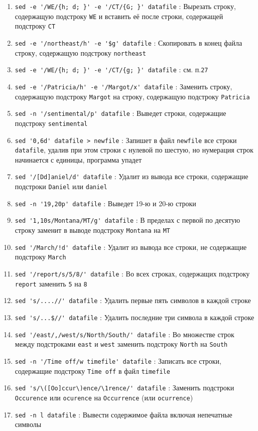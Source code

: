 \documentclass[12pt, a4paper]{article}
\begin{document}
\begin{enumerate}
  \item \verb|sed -e '/WE/{h; d; }' -e '/CT/{G; }' datafile| : Вырезать строку,
    содержащую подстроку \verb|WE| и вставить её после строки, содержащей
    подстроку \verb|CT|
  \item \verb|sed -e '/northeast/h' -e '$g' datafile| : Скопировать в конец
    файла строку, содержащую подстроку \verb|northeast|
  \item \verb|sed -e '/WE/{h; d; }' -e '/CT/{g; }' datafile| : см. п.\verb|27|
  \item \verb|sed -e '/Patricia/h' -e '/Margot/x' datafile| : Заменить строку,
    содержащую подстроку \verb|Margot| на строку, содержащую подстроку
    \verb|Patricia|
  \item \verb|sed -n '/sentimental/p' datafile| : Выведет строки, содержащие
    подстроку \verb|sentimental|
  \item \verb|sed '0,6d' datafile > newfile| : Запишет в файл \verb|newfile|
    все строки \verb|datafile|, удалив при этом строки с нулевой по шестую,
    но нумерация строк начинается с единицы, программа упадет
  \item \verb|sed '/[Dd]aniel/d' datafile| : Удалит из вывода все строки,
    содержащие подстроки \verb|Daniel| или \verb|daniel|
  \item \verb|sed -n '19,20p' datafile| : Выведет 19-ю и 20-ю строки
  \item \verb|sed '1,10s/Montana/MT/g' datafile| : В пределах с первой по десятую
    строку заменит в выводе подстроку \verb|Montana| на \verb|MT|
  \item \verb|sed '/March/!d' datafile| : Удалит из вывода все строки, не
    содержащие подстроку \verb|March|
  \item \verb|sed '/report/s/5/8/' datafile| : Во всех строках, содержащих
    подстроку \verb|report| заменить \verb|5| на \verb|8|
  \item \verb|sed 's/....//' datafile| : Удалить первые пять символов в каждой
    строке
  \item \verb|sed 's/...$//' datafile| : Удалить последние три символа в каждой
    строке
  \item \verb|sed '/east/,/west/s/North/South/' datafile| : Во множестве строк
    между подстроками \verb|east| и \verb|west| заменить подстроку \verb|North|
    на \verb|South|
  \item \verb|sed -n '/Time off/w timefile' datafile| : Записать все строки,
    содержащие подстроку \verb|Time off| в файл \verb|timefile|
  \item \verb|sed 's/\([Oo]ccur\)ence/\1rence/' datafile| : Заменить подстроки
    \verb|Occurence| или \verb|ocurence| на \verb|Occurrence| (или \verb|ocurrence|)
  \item \verb|sed -n l datafile| : Вывести содержимое файла включая непечатные
    символы
\end{enumerate}
\end{document}

